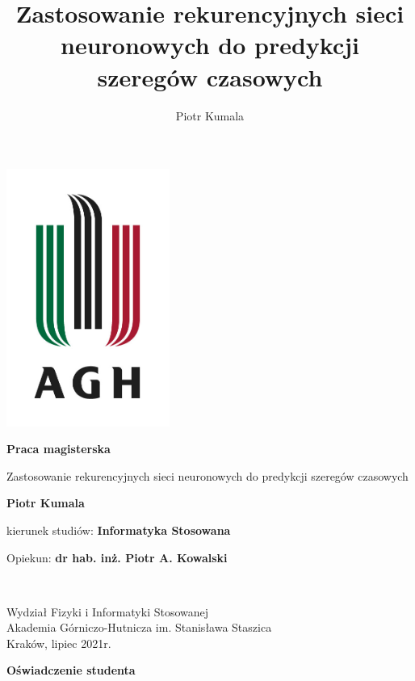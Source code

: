 \documentclass[10pt,a4paper]{article}
\author{Piotr Kumala}
\title{Zastosowanie rekurencyjnych sieci neuronowych do predykcji szeregów czasowych}
\date{}
\begin{document}
\begin{titlepage}
	\begin{center}
		\includegraphics[width=0.4\textwidth]{img/university.jpg}
		\vspace*{1cm}
		
		{\Huge
			\textbf{Praca magisterska} \\
			
		}
		\vspace{0.5cm}
		{\Large
			Zastosowanie rekurencyjnych sieci neuronowych do predykcji szeregów czasowych
			
			\vspace{1cm}
			
			\textbf{Piotr Kumala} \\
		}
		\vspace{0.5cm}
		kierunek studiów: \textbf{Informatyka Stosowana} \\
		
		\vspace{1cm}
		
		{\Large Opiekun: \textbf{dr hab. inż. Piotr A. Kowalski}}
		\vfill
		
		\
		\vspace{0.8cm}
		
		
		Wydział Fizyki i Informatyki Stosowanej\\
		Akademia Górniczo-Hutnicza im. Stanisława Staszica\\
		Kraków, lipiec 2021r.
		
	\end{center}
\end{titlepage}
\newpage
\begin{center}
	\textbf{Oświadczenie studenta}
\end{center}
\end{document}
